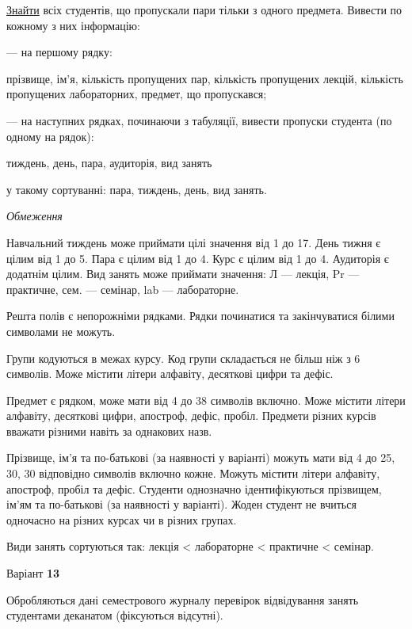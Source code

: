 \documentclass[11pt, ukrainian]{article}
\begin{document}
\underline{Знайти} всіх студентів, що пропускали пари тільки з одного предмета. Вивести по кожному з них інформацію:\par
{\noindent}--- на першому рядку:\par
прізвище, ім’я, кількість пропущених пар, кількість пропущених лекцій, кількість пропущених лабораторних, предмет, що пропускався;

{\noindent}--- на наступних рядках, починаючи з табуляції, вивести пропуски студента (по одному на рядок):\par
тиждень, день, пара, аудиторія, вид занять

{\noindent}у такому сортуванні: пара, тиждень, день, вид занять.


\bigskip\textit{Обмеження}

Навчальний тиждень може приймати цілі значення від 1 до 17.
День тижня є цілим від 1 до 5. Пара є цілим від 1 до 4.
Курс є цілим від 1 до 4. Аудиторія є додатнім цілим.
Вид занять може приймати значення:
Л --- лекція, Pr --- практичне, сем. --- семінар, lab --- лабораторне.

Решта полів є непорожніми рядками.
Рядки починатися та закінчуватися білими символами не можуть.

Групи кодуються в межах курсу.
Код групи складається не більш ніж з 6 символів.
Може містити літери алфавіту, десяткові цифри та дефіс.

Предмет є рядком, може мати від 4 до 38 символів включно.
Може містити літери алфавіту, десяткові цифри, апостроф, дефіс, пробіл.
Предмети різних курсів вважати різними навіть за однакових назв.

Прізвище, ім’я та по-батькові (за наявності у варіанті)
можуть мати від 4 до 25, 30, 30 відповідно символів включно кожне.
Можуть містити літери алфавіту, апостроф, пробіл та дефіс.
Студенти однозначно ідентифікуються прізвищем, ім’ям та по-батькові (за наявності у варіанті).
Жоден студент не вчиться одночасно на різних курсах чи в різних групах.

Види занять сортуються так: лекція < лабораторне < практичне < семінар.



\par
\newpage
{\center Варіант  \No \textbf { 13 }\par}
\bigskip
Обробляються дані семестрового журналу перевірок відвідування занять студентами деканатом (фіксуються відсутні). 
\end{document}
